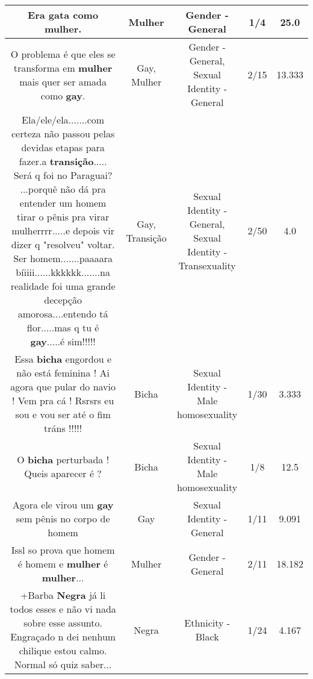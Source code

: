 \documentclass[11pt]{article}
\newlength\mylength
\begin{document}
\begin{center}
\begin{longtable}{|C{.65\mylength}|C{.30\mylength}|C{.12\mylength}|C{.12\mylength}|C{.12\mylength}|}
  \small Era gata como \textbf{mulher}.\normalsize   & Mulher & Gender - General & 1/4 & 25.0 \\  \hline
  \small O problema é que eles se transforma em \textbf{mulher} mais quer ser amada como \textbf{gay}.\normalsize   & Gay, Mulher & Gender - General, Sexual Identity - General & 2/15 & 13.333 \\  \hline
  \small Ela/ele/ela.......com certeza não passou pelas devidas etapas para fazer.a \textbf{transição}..... Será q foi no Paraguai? ...porquê não dá pra entender um homem tirar o pênis pra virar mulherrrr.....e depois vir dizer q "resolveu" voltar. Ser homem.......paaaara bíiiii......kkkkkk.......na realidade foi uma grande decepção amorosa....entendo tá flor.....mas q tu é \textbf{gay}.....é sim!!!!!\normalsize   & Gay, Transição & Sexual Identity - General, Sexual Identity - Transexuality & 2/50 & 4.0 \\  \hline
  \small Essa \textbf{bicha} engordou  e não  está  feminina  ! Ai agora que  pular do navio ! Vem pra cá  ! Rsrsrs  eu sou e vou ser até o fim  tráns  !!!!!\normalsize   & Bicha & Sexual Identity - Male homosexuality & 1/30 & 3.333 \\  \hline
  \small O \textbf{bicha} perturbada !  Queis  aparecer é  ?\normalsize   & Bicha & Sexual Identity - Male homosexuality & 1/8 & 12.5 \\  \hline
  \small Agora ele virou um \textbf{gay} sem pênis no corpo de homem\normalsize   & Gay & Sexual Identity - General & 1/11 & 9.091 \\  \hline
  \small Issl so prova que homem é homem e \textbf{mulher} é \textbf{mulher}...\normalsize   & Mulher & Gender - General & 2/11 & 18.182 \\  \hline
  \small +Barba \textbf{Negra} já li todos esses e não vi nada sobre esse assunto. Engraçado n dei nenhum chilique estou calmo. Normal só quiz saber...\normalsize   & Negra & Ethnicity - Black & 1/24 & 4.167 \\  \hline

\end{longtable}
\end{center}
\end{document}
